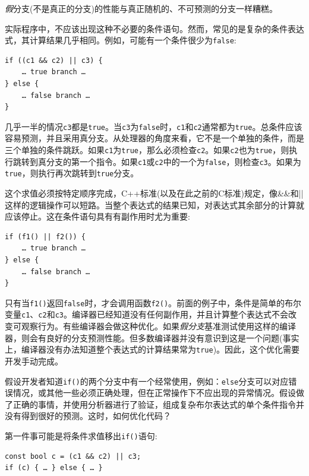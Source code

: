 \textit{假}分支(不是真正的分支)的性能与真正随机的、不可预测的分支一样糟糕。

实际程序中，不应该出现这种不必要的条件语句。然而，常见的是复杂的条件表达式，其计算结果几乎相同。例如，可能有一个条件很少为\texttt{false}:

\begin{lstlisting}[style=styleCXX]
if ((c1 && c2) || c3) {
	… true branch …
} else {
	… false branch …
}
\end{lstlisting}

几乎一半的情况\texttt{c3}都是\texttt{true}。当\texttt{c3}为\texttt{false}时，\texttt{c1}和\texttt{c2}通常都为\texttt{true}。总条件应该容易预测，并且采用真分支。从处理器的角度来看，它不是一个单独的条件，而是三个单独的条件跳跃。如果\texttt{c1}为\texttt{true}，那么必须检查\texttt{c2}。如果\texttt{c2}也为\texttt{true}，则执行跳转到真分支的第一个指令。如果\texttt{c1}或\texttt{c2}中的一个为\texttt{false}，则检查\texttt{c3}。如果为\texttt{true}，则执行再次跳转到\texttt{true}分支。

这个求值必须按特定顺序完成，C++标准(以及在此之前的C标准)规定，像\&\&和||这样的逻辑操作可以短路。当整个表达式的结果已知，对表达式其余部分的计算就应该停止。这在条件语句具有有副作用时尤为重要:

\begin{lstlisting}[style=styleCXX]
if (f1() || f2()) {
	… true branch …
} else {
	… false branch …
}
\end{lstlisting}

只有当\texttt{f1()}返回\texttt{false}时，才会调用函数\texttt{f2()}。前面的例子中，条件是简单的布尔变量\texttt{c1}、\texttt{c2}和\texttt{c3}。编译器已经知道没有任何副作用，并且计算整个表达式不会改变可观察行为。有些编译器会做这种优化。如果\textit{假分支}基准测试使用这样的编译器，则会有良好的分支预测性能。但多数编译器并没有意识到这是一个问题(事实上，编译器没有办法知道整个表达式的计算结果常为\texttt{true})。因此，这个优化需要开发手动完成。

假设开发者知道\texttt{if()}的两个分支中有一个经常使用，例如：\texttt{else}分支可以对应错误情况，或其他一些必须正确处理，但在正常操作下不应出现的异常情况。假设做了正确的事情，并使用分析器进行了验证，组成复杂布尔表达式的单个条件指令并没有得到很好的预测。这时，如何优化代码？

第一件事可能是将条件求值移出\texttt{if()}语句:

\begin{lstlisting}[style=styleCXX]
const bool c = (c1 && c2) || c3;
if (c) { … } else { … }
\end{lstlisting}

